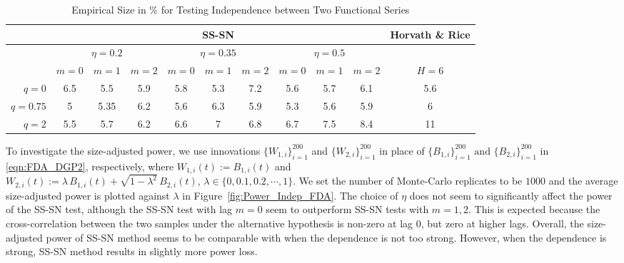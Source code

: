 \documentclass[11pt]{article}
\theoremstyle{plain}
\theoremstyle{definition}
\theoremstyle{remark}
\begin{document}
\begin{table}
\centering
\caption{Empirical Size in \% for Testing Independence between Two Functional Series}
    \label{tab:Size_Indep_FDA}
    \begin{tabular}{@{}r|ccc|ccc|ccc|c@{}}
    \hline
     & \multicolumn{9}{|c|}{SS-SN} & Horvath \& Rice\\
    \hline 
      & \multicolumn{3}{|c|}{$\eta=0.2$} &\multicolumn{3}{|c|}{$\eta=0.35$} & \multicolumn{3}{|c|}{$\eta=0.5$} & \\
    \hline
    & $m=0$ & $m=1$ & $m=2$ & $m=0$ & $m=1$ & $m=2$ & $m=0$ & $m=1$ & $m=2$ & $H=6$\\
    \hline
    $q=0$ & 6.5 & 5.5 & 5.9  & 5.8 & 5.3 & 7.2 & 5.6 & 5.7 & 6.1 & 5.6\\
    $q=0.75$ & 5 & 5.35 & 6.2 & 5.6 & 6.3 & 5.9 & 5.3 & 5.6 & 5.9 & 6\\
    $q=2$ & 5.5 & 5.7 & 6.2 & 6.6 & 7 & 6.8 & 6.7 & 7.5& 8.4 & 11\\
    \hline
    \end{tabular}
\end{table}
To investigate the size-adjusted power, we use innovations $\{W_{1,i}\}_{i=1}^{200}$ and $\{W_{2,i}\}_{i=1}^{200}$ in place of $\{B_{1,i}\}_{i=1}^{200} \text{ and } \{B_{2,i}\}_{i=1}^{200}$  in \eqref{eqn:FDA_DGP2}, respectively, where $W_{1,i}(t):=B_{1,i}(t)$ and\\ $W_{2,i}(t):=\lambda\, B_{1,i}(t)+\sqrt{1-\lambda^2}\,B_{2,i}(t)$, $\lambda \in \{0, 0.1, 0.2, \cdots,1\}.$ We set the number of Monte-Carlo replicates to be $1000$ and the average size-adjusted power is plotted against $\lambda$ in Figure~\ref{fig:Power_Indep_FDA}. The choice of $\eta$ does not seem to significantly affect the power of the SS-SN test, although the SS-SN test with lag $m=0$ seem to  outperform SS-SN tests with $m=1,2$. This is expected because the cross-correlation between the two samples under the alternative hypothesis is non-zero at lag $0$, but zero at higher lags. Overall, the size-adjusted power of SS-SN method seems to be comparable with \cite{horvath2015testing} when the dependence is not too strong. However, when the dependence is strong, SS-SN method results in slightly more power loss.
\end{document}
